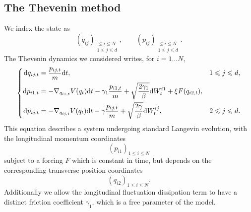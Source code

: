\subsection{The Thevenin method}
We index the state as \[\left(q_{ij}\right)_{\substack{\leq i\leq N\\1\leq j\leq d}},\qquad \left(p_{ij}\right)_{\substack{\leq i\leq N\\1\leq j\leq d}}.\]
The Thevenin dynamics we considered writes, for $i=1\dots N$,
\begin{equation}
    \label{eq:thevenin_sv_dynamics}
    \left\{\begin{aligned}
        \mathrm{d} q_{ij,t}&=\frac{p_{ij,t}}m\mathrm{d} t,&1\leqslant j\leqslant d,\\
        \mathrm{d} p_{i1,t}&=-\nabla_{q_{i1,t}}V(q_t)\mathrm{d} t-\gamma_1\frac{p_{i1,t}}m+\sqrt{\frac{2\gamma_1}\beta}\mathrm{d} W_t^{i1}+\xi F(q_{i2,t}),&\\
        \mathrm{d} p_{ij,t}&=-\nabla_{q_{ij,t}}V(q_t)\mathrm{d} t-\gamma \frac{p_{ij,t}}m+\sqrt{\frac{2\gamma}\beta}\mathrm{d} W_t^{ij},&2\leqslant j\leqslant d.
    \end{aligned}\right.
\end{equation}
This equation describes a system undergoing standard Langevin evolution, with the longitudinal momentum coordinates 
\[\left(p_{i1}\right)_{1\leq i\leq N}\]
subject to a forcing $F$ which is constant in time, but depends on the corresponding transverse position coordinates
\[\left(q_{i2}\right)_{1\leq i\leq N}.\]
Additionally we allow the longitudinal fluctuation dissipation term to have a distinct friction coefficient $\gamma_1$, which is a free parameter of the model.

